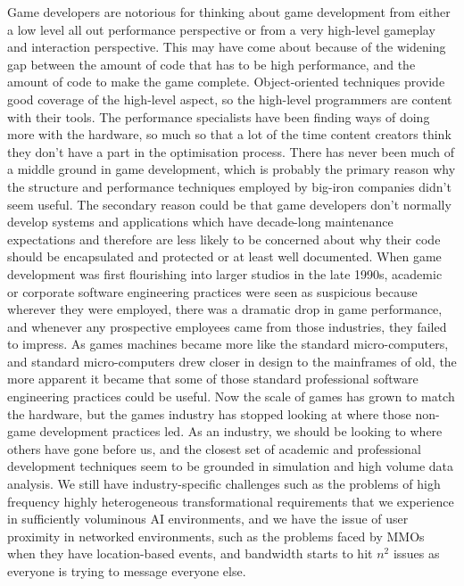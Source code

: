 \documentclass[a4paper,12pt]{article}
\begin{document}
Game developers are notorious for thinking about game development from either a low level all out performance perspective or from a very high-level gameplay and interaction perspective.
This may have come about because of the widening gap between the amount of code that has to be high performance, and the amount of code to make the game complete.
Object-oriented techniques provide good coverage of the high-level aspect, so the high-level programmers are content with their tools.
The performance specialists have been finding ways of doing more with the hardware, so much so that a lot of the time content creators think they don't have a part in the optimisation process.
There has never been much of a middle ground in game development, which is probably the primary reason why the structure and performance techniques employed by big-iron companies didn't seem useful.
The secondary reason could be that game developers don't normally develop systems and applications which have decade-long maintenance expectations and therefore are less likely to be concerned about why their code should be encapsulated and protected or at least well documented.
When game development was first flourishing into larger studios in the late 1990s, academic or corporate software engineering practices were seen as suspicious because wherever they were employed, there was a dramatic drop in game performance, and whenever any prospective employees came from those industries, they failed to impress.
As games machines became more like the standard micro-computers, and standard micro-computers drew closer in design to the mainframes of old, the more apparent it became that some of those standard professional software engineering practices could be useful.
Now the scale of games has grown to match the hardware, but the games industry has stopped looking at where those non-game development practices led.
As an industry, we should be looking to where others have gone before us, and the closest set of academic and professional development techniques seem to be grounded in simulation and high volume data analysis.
We still have industry-specific challenges such as the problems of high frequency highly heterogeneous transformational requirements that we experience in sufficiently voluminous AI environments, and we have the issue of user proximity in networked environments, such as the problems faced by MMOs when they have location-based events, and bandwidth starts to hit $n^2$ issues as everyone is trying to message everyone else.
\end{document}
